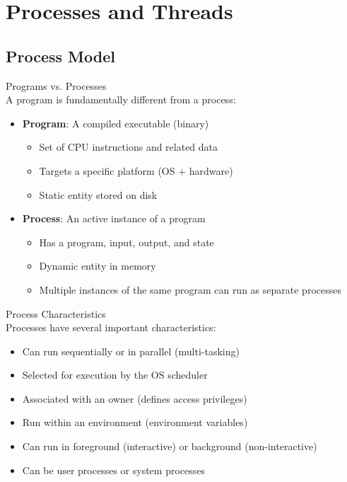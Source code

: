 \section{Processes and Threads}

\subsection{Process Model}

\begin{definition}{Programs vs. Processes}\\
    A program is fundamentally different from a process:
    \begin{itemize}
        \item \textbf{Program}: A compiled executable (binary)
            \begin{itemize}
                \item Set of CPU instructions and related data
                \item Targets a specific platform (OS + hardware)
                \item Static entity stored on disk
            \end{itemize}
        \item \textbf{Process}: An active instance of a program
            \begin{itemize}
                \item Has a program, input, output, and state
                \item Dynamic entity in memory
                \item Multiple instances of the same program can run as separate processes
            \end{itemize}
    \end{itemize}
\end{definition}

\begin{definition}{Process Characteristics}\\
    Processes have several important characteristics:
    \begin{itemize}
        \item Can run sequentially or in parallel (multi-tasking)
        \item Selected for execution by the OS scheduler
        \item Associated with an owner (defines access privileges)
        \item Run within an environment (environment variables)
        \item Can run in foreground (interactive) or background (non-interactive)
        \item Can be user processes or system processes
    \end{itemize}
\end{definition}

